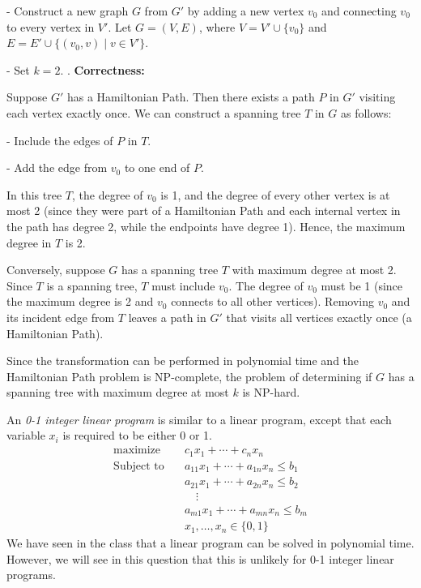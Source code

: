 \documentclass{oxmathproblems}
\begin{document}
\begin{questions}
   - Construct a new graph \( G \) from \( G' \) by adding a new vertex \( v_0 \) and connecting \( v_0 \) to every vertex in \( V' \). Let \( G = (V, E) \), where \( V = V' \cup \{v_0\} \) and \( E = E' \cup \{ (v_0, v) \mid v \in V' \} \).
   
   - Set \( k = 2 \).
. \textbf{Correctness:}

   Suppose \( G' \) has a Hamiltonian Path. Then there exists a path \( P \) in \( G' \) visiting each vertex exactly once. We can construct a spanning tree \( T \) in \( G \) as follows:
   
     - Include the edges of \( P \) in \( T \).
     
     - Add the edge from \( v_0 \) to one end of \( P \).

     In this tree \( T \), the degree of \( v_0 \) is 1, and the degree of every other vertex is at most 2 (since they were part of a Hamiltonian Path and each internal vertex in the path has degree 2, while the endpoints have degree 1). Hence, the maximum degree in \( T \) is 2.

   Conversely, suppose \( G \) has a spanning tree \( T \) with maximum degree at most 2. Since \( T \) is a spanning tree, \( T \) must include \( v_0 \). The degree of \( v_0 \) must be 1 (since the maximum degree is 2 and \( v_0 \) connects to all other vertices). Removing \( v_0 \) and its incident edge from \( T \) leaves a path in \( G' \) that visits all vertices exactly once (a Hamiltonian Path).

Since the transformation can be performed in polynomial time and the Hamiltonian Path problem is NP-complete, the problem of determining if \( G \) has a spanning tree with maximum degree at most \( k \) is NP-hard.

\miquestion[50] 
An \emph{0-1 integer linear program} is similar to a linear program, except that each variable $x_i$ is required to be either 0 or 1.
\begin{align*}
   \text{maximize} & \quad c_1x_1+\cdots+c_nx_n\\
   \text{Subject to} & \quad a_{11}x_1+\cdots + a_{1n}x_n\leq b_1\\
   &\quad a_{21}x_1+\cdots+a_{2n}x_n\leq b_2\\
   &\qquad\vdots\\
   &\quad a_{m1}x_1+\cdots+a_{mn}x_n\leq b_m\\
   &\quad x_1,\ldots,x_n\in\{0,1\}
\end{align*}
We have seen in the class that a linear program can be solved in polynomial time. However, we will see in this question that this is unlikely for 0-1 integer linear programs.
\begin{parts}

\end{parts}
\end{questions}
\end{document}
